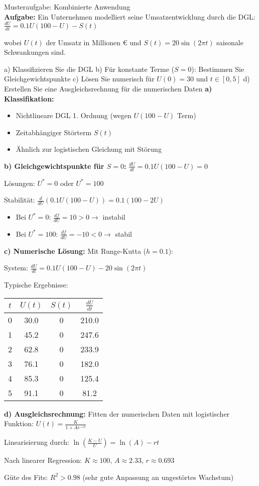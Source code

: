 \begin{example2}{Musteraufgabe: Kombinierte Anwendung}\\
\textbf{Aufgabe:} Ein Unternehmen modelliert seine Umsatzentwicklung durch die DGL:
$\frac{dU}{dt} = 0.1U(100 - U) - S(t)$

wobei $U(t)$ der Umsatz in Millionen € und $S(t) = 20\sin(2\pi t)$ saisonale Schwankungen sind.

a) Klassifizieren Sie die DGL
b) Für konstante Terme ($S = 0$): Bestimmen Sie Gleichgewichtspunkte
c) Lösen Sie numerisch für $U(0) = 30$ und $t \in [0, 5]$
d) Erstellen Sie eine Ausgleichsrechnung für die numerischen Daten
\tcblower
\textbf{a) Klassifikation:}
\begin{itemize}
    \item Nichtlineare DGL 1. Ordnung (wegen $U(100-U)$ Term)
    \item Zeitabhängiger Störterm $S(t)$
    \item Ähnlich zur logistischen Gleichung mit Störung
\end{itemize}

\textbf{b) Gleichgewichtspunkte für $S = 0$:}
$\frac{dU}{dt} = 0.1U(100 - U) = 0$

Lösungen: $U^* = 0$ oder $U^* = 100$

Stabilität:
$\frac{d}{dU}(0.1U(100-U)) = 0.1(100 - 2U)$

\begin{itemize}
    \item Bei $U^* = 0$: $\frac{df}{dU} = 10 > 0 \rightarrow$ instabil
    \item Bei $U^* = 100$: $\frac{df}{dU} = -10 < 0 \rightarrow$ stabil
\end{itemize}

\textbf{c) Numerische Lösung:}
Mit Runge-Kutta ($h = 0.1$):

System: $\frac{dU}{dt} = 0.1U(100-U) - 20\sin(2\pi t)$

Typische Ergebnisse:
\begin{center}
\begin{tabular}{|c|c|c|c|}
\hline
$t$ & $U(t)$ & $S(t)$ & $\frac{dU}{dt}$ \\
\hline
0 & 30.0 & 0 & 210.0 \\
1 & 45.2 & 0 & 247.6 \\
2 & 62.8 & 0 & 233.9 \\
3 & 76.1 & 0 & 182.0 \\
4 & 85.3 & 0 & 125.4 \\
5 & 91.1 & 0 & 81.2 \\
\hline
\end{tabular}
\end{center}

\textbf{d) Ausgleichsrechnung:}
Fitten der numerischen Daten mit logistischer Funktion:
$U(t) = \frac{K}{1 + Ae^{-rt}}$

Linearisierung durch: $\ln(\frac{K-U}{U}) = \ln(A) - rt$

Nach linearer Regression: $K \approx 100$, $A \approx 2.33$, $r \approx 0.693$

Güte des Fits: $R^2 > 0.98$ (sehr gute Anpassung an ungestörtes Wachstum)
\end{example2}

